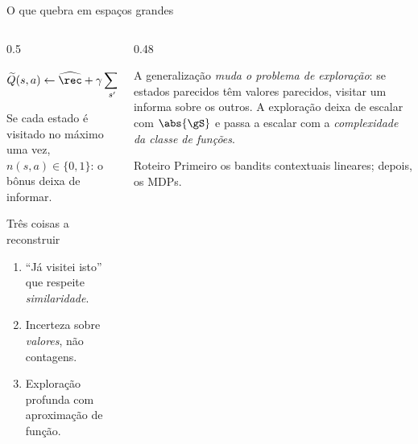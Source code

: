 \documentclass[aspectratio=169, 11pt]{beamer}
\newcommand{\Qtil}{\widetilde{Q}}
\newcommand{\Rhat}{\widehat{\rec}}
\newcommand{\That}{\widehat{P}}
\begin{document}
\begin{frame}{O que quebra em espaços grandes}
  \begin{columns}[T]
    \begin{column}{0.5\textwidth}
      \begin{alertabox}
        \vspace{-0.9em}
        \[
          \Qtil(s,a) \gets \Rhat + \gamma\sum_{s'}\That\max_{a'}\Qtil
          + \frac{\beta}{\sqrt{\mdestaque{rlVermelho}{n(s,a)}}}
        \]
        \vspace{-1.2em}

        Se cada estado é visitado no máximo uma vez, $n(s,a) \in \{0,1\}$: o bônus
        deixa de informar.
      \end{alertabox}
      \begin{defbox}{Três coisas a reconstruir}
        \begin{enumerate}\setlength{\itemsep}{0.1ex}
          \item ``Já visitei isto'' que respeite \emph{similaridade}.
          \item Incerteza sobre \emph{valores}, não contagens.
          \item Exploração profunda com aproximação de função.
        \end{enumerate}
      \end{defbox}
    \end{column}
    \begin{column}{0.48\textwidth}
      \begin{ideiabox}
        A generalização \emph{muda o problema de exploração}: se estados parecidos têm
        valores parecidos, visitar um informa sobre os outros. A exploração deixa de
        escalar com $\abs{\gS}$ e passa a escalar com a \emph{complexidade da classe
        de funções}.
      \end{ideiabox}
      \begin{teobox}{Roteiro}
        Primeiro os bandits contextuais lineares; depois, os MDPs.
      \end{teobox}
    \end{column}
  \end{columns}
\end{frame}
\end{document}
